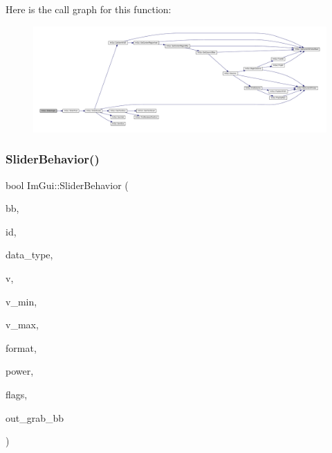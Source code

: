Here is the call graph for this function\+:
\nopagebreak
\begin{figure}[H]
\begin{center}
\leavevmode
\includegraphics[width=350pt]{namespace_im_gui_ad20170a9fff4ded0076476dad8ec6645_cgraph}
\end{center}
\end{figure}
\mbox{\label{namespace_im_gui_a4e0edc9434473ac6590d8d8af2291f24}} 
\subsubsection{\texorpdfstring{Slider\+Behavior()}{SliderBehavior()}}
{\footnotesize\ttfamily bool Im\+Gui\+::\+Slider\+Behavior (\begin{DoxyParamCaption}\item[{const \mbox{\hyperlink{struct_im_rect}{Im\+Rect}} \&}]{bb,  }\item[{\mbox{\hyperlink{imgui_8h_a1785c9b6f4e16406764a85f32582236f}{Im\+Gui\+ID}}}]{id,  }\item[{\mbox{\hyperlink{imgui_8h_a4cfa8697a3d76722fff83eb18922e9d5}{Im\+Gui\+Data\+Type}}}]{data\+\_\+type,  }\item[{void $\ast$}]{v,  }\item[{const void $\ast$}]{v\+\_\+min,  }\item[{const void $\ast$}]{v\+\_\+max,  }\item[{const char $\ast$}]{format,  }\item[{float}]{power,  }\item[{\mbox{\hyperlink{imgui__internal_8h_a50cc3e3e4beb155e2186f8c1dc057e18}{Im\+Gui\+Slider\+Flags}}}]{flags,  }\item[{\mbox{\hyperlink{struct_im_rect}{Im\+Rect}} $\ast$}]{out\+\_\+grab\+\_\+bb }\end{DoxyParamCaption})}

\mbox{\label{namespace_im_gui_ab9dee3b5cb6249c0929f90ed0647bd8b}} 
